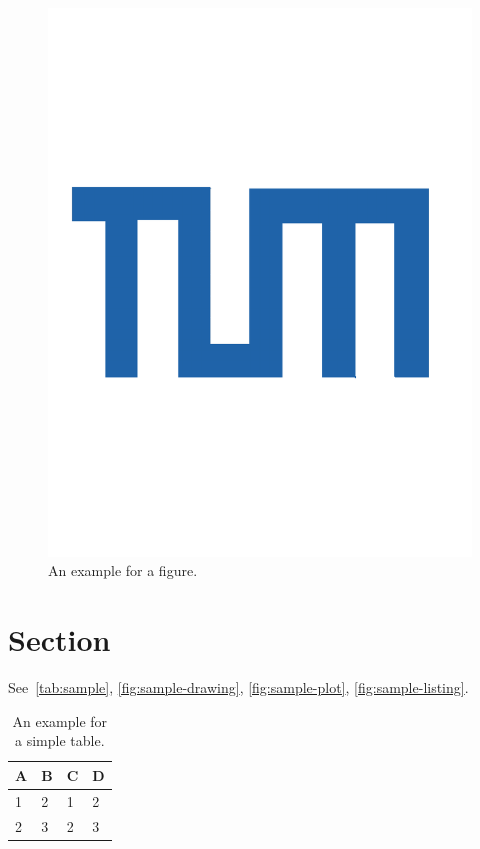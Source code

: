 \begin{figure}[htsb]
  \centering
  \includegraphics{logos/tum}
  \caption[Example figure]{An example for a figure.}\label{fig:sample}
\end{figure}

\section{Section}

See~\autoref{tab:sample}, \autoref{fig:sample-drawing}, \autoref{fig:sample-plot}, \autoref{fig:sample-listing}.

\begin{table}[htsb]
  \caption[Example table]{An example for a simple table.}\label{tab:sample}
  \centering
  \begin{tabular}{l l l l}
    \toprule
      A & B & C & D \\
    \midrule
      1 & 2 & 1 & 2 \\
      2 & 3 & 2 & 3 \\
    \bottomrule
  \end{tabular}
\end{table}

